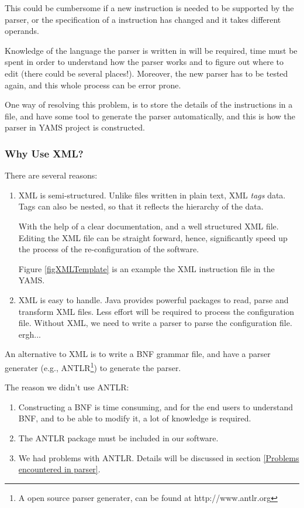 This could be cumbersome if a new instruction is needed to be
supported by the parser, or the specification of a instruction has
changed and it takes different operands.

Knowledge of the language the parser is written in will be required,
time must be spent in order to understand how the parser works and
to figure out where to edit (there could be several places!). Moreover,
the new parser has to be tested again, and this whole process can be
error prone.

One way of resolving this problem, is to store the details of the
instructions in a file, and have some tool to generate the parser
automatically, and this is how the parser in YAMS project is constructed.

\subsubsection{Why Use XML?}

There are several reasons:

\begin{enumerate}

\item XML is semi-structured. Unlike files written in plain text,
XML \emph{tags} data. Tags can also be nested, so that it reflects
the hierarchy of the data.

With the help of a clear documentation, and a well structured XML file.
Editing the XML file can be straight forward, hence, significantly speed
up the process of the re-configuration of the software.

Figure \ref{figXMLTemplate} is an example the XML instruction file in the
YAMS.

\item XML is easy to handle. Java provides powerful packages to
read, parse and transform XML files. Less effort will be
required to process the configuration file. Without XML, we need
to write a parser to parse the configuration file. ergh...

\end{enumerate}

An alternative to XML is to write a BNF grammar file, and have a
parser generater (e.g., ANTLR\footnote{A open source parser
generater, can be found at http://www.antlr.org}) to generate the
parser.

The reason we didn't use ANTLR:

\begin{enumerate}

\item Constructing a BNF is time consuming, and for the end users
to understand BNF, and to be able to modify it, a lot of knowledge
is required.

\item The ANTLR package must be included in our software.

\item We had problems with ANTLR. Details will be discussed in
section \ref{Problems encountered in parser}.

\end{enumerate}

